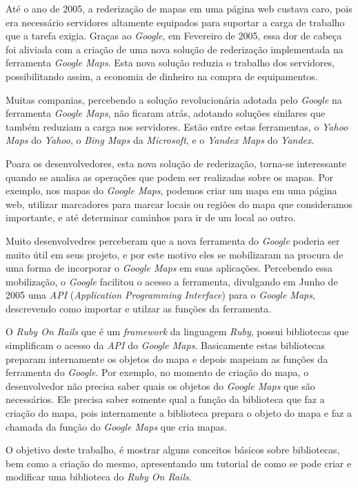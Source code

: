 Até o ano de 2005, a rederização de mapas em uma página web custava caro, pois era necessário
servidores altamente equipados para suportar a carga de trabalho que a tarefa exigia.
Graças ao \emph{Google}, em Fevereiro de 2005, essa dor de cabeça foi aliviada com a criação
de uma nova solução de rederização implementada na ferramenta \emph{Google Maps}. Esta nova
solução reduzia o trabalho dos servidores, possibilitando assim, a economia de dinheiro na
compra de equipamentos.

Muitas companias, percebendo a solução revolucionária adotada pelo \emph{Google} na
ferramenta \emph{Google Maps}, não ficaram atrás, adotando soluções sinilares que
também reduziam a carga nos servidores. Estão entre estas ferramentas, o
\emph{Yahoo Maps} do \emph{Yahoo}, o \emph{Bing Maps} da \emph{Microsoft}, e o
\emph{Yandex Maps} do \emph{Yandex}.

Poara os desenvolvedores, esta nova solução de rederização, torna-se interessante
quando se analisa as operações que podem ser realizadas sobre os mapas. Por exemplo, nos mapas
do \emph{Google Maps}, podemos criar um mapa em uma página web, utilizar marcadores para
marcar locais ou regiões do mapa que consideramos importante, e até determinar caminhos
para ir de um local ao outro.

Muito desenvolvedres perceberam que a nova ferramenta do \emph{Google} poderia ser muito útil
em seus projeto, e por este motivo eles se mobilizaram na procura de uma forma de incorporar o
\emph{Google Maps} em suas aplicações. Percebendo essa mobilização, o \emph{Google} facilitou
o acesso a ferramenta, divulgando em Junho de 2005 uma \emph{API}
(\emph{Application Programming Interface}) para o \emph{Google Maps}, descrevendo como importar
e utilzar as funções da ferramenta.

O \emph{Ruby On Rails} que é um \emph{framework} da linguagem \emph{Ruby}, possui
bibliotecas que simplificam o acesso da \emph{API} do \emph{Google Maps}. Basicamente estas
bibliotecas preparam internamente os objetos do mapa e depois mapeiam as funções da
ferramenta do \emph{Google}. Por exemplo, no momento de criação do mapa, o desenvolvedor
não precisa saber quais os objetos do \emph{Google Maps} que são necessários. Ele
precisa saber somente qual a função da biblioteca que faz a criação do mapa, pois
internamente a biblioteca prepara o objeto do mapa e faz a chamada da função do
\emph{Google Maps} que cria mapas.

O objetivo deste trabalho, é mostrar alguns conceitos básicos sobre bibliotecas, bem
como a criação do mesmo, apresentando um tutorial de como se pode criar e modificar
uma biblioteca do \emph{Ruby On Rails}.


